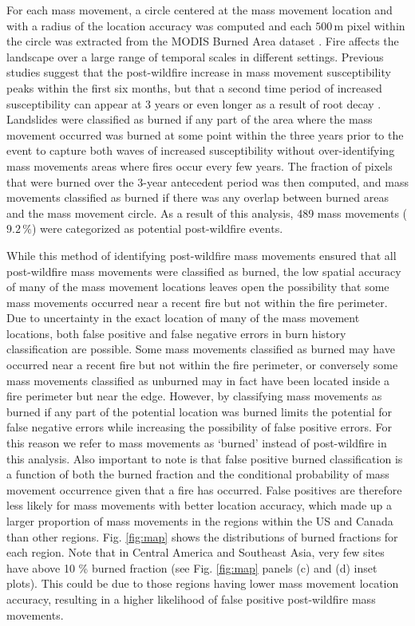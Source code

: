 \documentclass[nhess, manuscript]{copernicus}
\begin{document}
For each mass movement, a circle centered at the mass movement location and with
a radius of the location accuracy was computed and each $500\,\text{m}$ pixel 
within the circle was extracted from the MODIS Burned Area dataset
\citep{giglioCollectionMODISBurned2018}. Fire affects the landscape over a large
range of temporal scales in different settings. Previous studies suggest
that the post-wildfire increase in mass movement susceptibility peaks within the 
first six months, but that a second time period of increased susceptibility 
can appear at 3 years or even longer as a result of root decay
\citep{degraffTimingSusceptibilityPostFire2015, gartnerEmpiricalModelsPredicting2014}. 
Landslides were classified as burned if any part of
the area where the mass movement occurred was burned at some point 
within the three years prior to
the event to capture both waves of increased susceptibility without 
over-identifying mass movements areas where fires occur every few years. 
The fraction of pixels that were burned over the 3-year
antecedent period was then computed, and mass movements classified as burned
if there was any overlap between burned areas and the mass movement circle.
As a result of this analysis, 489 mass movements (\(9.2\,\%\)) were categorized
as potential post-wildfire events.

While this method of identifying post-wildfire mass movements ensured that
all post-wildfire mass movements were classified as burned, the low spatial
accuracy of many of the mass movement locations leaves open the possibility
that some mass movements occurred near a recent fire but not within the fire
perimeter. Due to uncertainty in the exact location of many of the mass movement 
locations, both false positive and false negative errors in burn history 
classification are possible. Some mass movements classified as burned may 
have occurred near a recent fire but not within the fire perimeter, or 
conversely some mass movements classified as unburned may in fact have 
been located inside a fire perimeter but near the edge. However, by 
classifying mass movements as burned if any part of the potential location 
was burned limits the potential for false negative errors while increasing 
the possibility of false positive errors. For this reason we refer to mass 
movements as ‘burned’ instead of post-wildfire in this analysis. Also 
important to note is that false positive burned classification is a 
function of both the burned fraction and the conditional probability 
of mass movement occurrence given that a fire has occurred. False positives 
are therefore
less likely for mass movements with better location accuracy, which made up a 
larger proportion of mass movements in the regions within the US and Canada than other regions.
Fig. \ref{fig:map} shows the distributions of burned fractions for
each region. Note that in Central America and Southeast Asia, very few
sites have above 10 \% burned fraction (see Fig. \ref{fig:map}
panels (c) and (d) inset plots). This could be due to those regions having 
lower mass movement location accuracy, resulting in a higher likelihood of 
false positive post-wildfire mass movements. 
\end{document}
